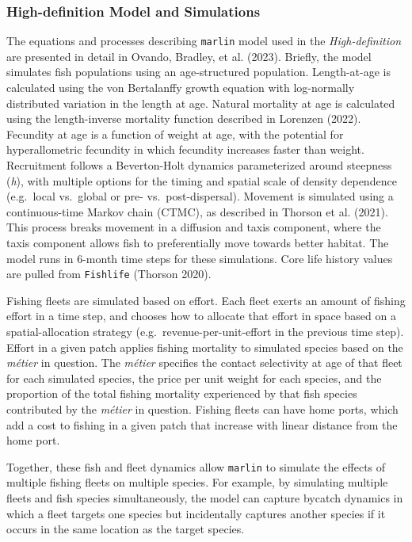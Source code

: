 \documentclass[
  default,
  lineno,
  referee]{sn-jnl}
\begin{document}
\subsubsection{High-definition Model and
Simulations}\label{high-definition-model-and-simulations}

The equations and processes describing \texttt{marlin} model used in the
\emph{High-definition} are presented in detail in Ovando, Bradley, et
al. (2023). Briefly, the model simulates fish populations using an
age-structured population. Length-at-age is calculated using the von
Bertalanffy growth equation with log-normally distributed variation in
the length at age. Natural mortality at age is calculated using the
length-inverse mortality function described in Lorenzen (2022).
Fecundity at age is a function of weight at age, with the potential for
hyperallometric fecundity in which fecundity increases faster than
weight. Recruitment follows a Beverton-Holt dynamics parameterized
around steepness (\emph{h}), with multiple options for the timing and
spatial scale of density dependence (e.g.~local vs.~global or pre-
vs.~post-dispersal). Movement is simulated using a continuous-time
Markov chain (CTMC), as described in Thorson et al. (2021). This process
breaks movement in a diffusion and taxis component, where the taxis
component allows fish to preferentially move towards better habitat. The
model runs in 6-month time steps for these simulations. Core life
history values are pulled from \texttt{Fishlife} (Thorson 2020).

Fishing fleets are simulated based on effort. Each fleet exerts an
amount of fishing effort in a time step, and chooses how to allocate
that effort in space based on a spatial-allocation strategy
(e.g.~revenue-per-unit-effort in the previous time step). Effort in a
given patch applies fishing mortality to simulated species based on the
\emph{métier} in question. The \emph{métier} specifies the contact
selectivity at age of that fleet for each simulated species, the price
per unit weight for each species, and the proportion of the total
fishing mortality experienced by that fish species contributed by the
\emph{métier} in question. Fishing fleets can have home ports, which add
a cost to fishing in a given patch that increase with linear distance
from the home port.

Together, these fish and fleet dynamics allow \texttt{marlin} to
simulate the effects of multiple fishing fleets on multiple species. For
example, by simulating multiple fleets and fish species simultaneously,
the model can capture bycatch dynamics in which a fleet targets one
species but incidentally captures another species if it occurs in the
same location as the target species.
\end{document}
